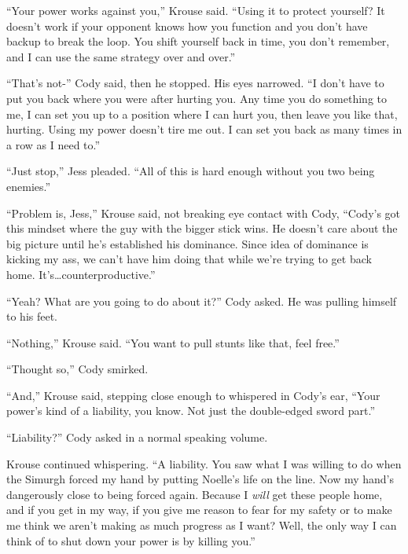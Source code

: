 ``Your power works against you,'' Krouse said.  ``Using it to protect yourself?  It doesn't work if your opponent knows how you function and you don't have backup to break the loop.  You shift yourself back in time, you don't remember, and I can use the same strategy over and over.''



``That's not-'' Cody said, then he stopped.  His eyes narrowed.  ``I don't have to put you back where you were after hurting you.  Any time you do something to me, I can set you up to a position where I can hurt you, then leave you like that, hurting.  Using my power doesn't tire me out.  I can set you back as many times in a row as I need to.''



``Just stop,'' Jess pleaded.  ``All of this is hard enough without you two being enemies.''



``Problem is, Jess,'' Krouse said, not breaking eye contact with Cody, ``Cody's got this mindset where the guy with the bigger stick wins. He doesn't care about the big picture until he's established his dominance.  Since idea of dominance is kicking my ass, we can't have him doing that while we're trying to get back home.  It's\ldots counterproductive.''



``Yeah?  What are you going to do about it?'' Cody asked.  He was pulling himself to his feet.



``Nothing,'' Krouse said.  ``You want to pull stunts like that, feel free.''



``Thought so,'' Cody smirked.



``And,'' Krouse said, stepping close enough to whispered in Cody's ear, ``Your power's kind of a liability, you know. Not just the double-edged sword part.''



``Liability?''  Cody asked in a normal speaking volume.



Krouse continued whispering.  ``A liability.  You saw what I was willing to do when the Simurgh forced my hand by putting Noelle's life on the line.  Now my hand's dangerously close to being forced again.  Because I \emph{will} get these people home, and if you get in my way, if you give me reason to fear for my safety or to make me think we aren't making as much progress as I want?  Well, the only way I can think of to shut down your power is by killing you.''



